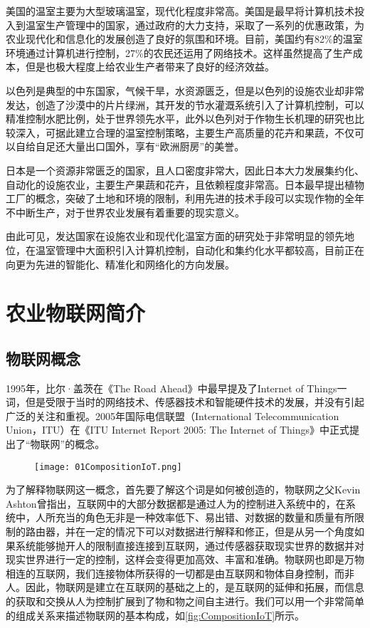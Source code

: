 美国的温室主要为大型玻璃温室，现代化程度非常高。美国是最早将计算机技术投入到温室生产管理中的国家，通过政府的大力支持，采取了一系列的优惠政策，为农业现代化和信息化的发展创造了良好的氛围和环境。目前，美国约有82\%的温室环境通过计算机进行控制，27\%的农民还运用了网络技术。这样虽然提高了生产成本，但是也极大程度上给农业生产者带来了良好的经济效益。

以色列是典型的中东国家，气候干旱，水资源匮乏，但是以色列的设施农业却非常发达，创造了沙漠中的片片绿洲，其开发的节水灌溉系统引入了计算机控制，可以精准控制水肥比例，处于世界领先水平，此外以色列对于作物生长机理的研究也比较深入，可据此建立合理的温室控制策略，主要生产高质量的花卉和果蔬，不仅可以自给自足还大量出口国外，享有“欧洲厨房”的美誉。

日本是一个资源非常匮乏的国家，且人口密度非常大，因此日本大力发展集约化、自动化的设施农业，主要生产果蔬和花卉，且依赖程度非常高。日本最早提出植物工厂的概念，突破了土地和环境的限制，利用先进的技术手段可以实现作物的全年不中断生产，对于世界农业发展有着重要的现实意义。

由此可见，发达国家在设施农业和现代化温室方面的研究处于非常明显的领先地位，在温室管理中大面积引入计算机控制，自动化和集约化水平都较高，目前正在向更为先进的智能化、精准化和网络化的方向发展。

\section{农业物联网简介}
	\subsection{物联网概念}
1995年，比尔·盖茨在《The Road Ahead》中最早提及了Internet of Things一词，但是受限于当时的网络技术、传感器技术和智能硬件技术的发展，并没有引起广泛的关注和重视。2005年国际电信联盟（International Telecommunication Union，ITU）在《ITU Internet Report 2005: The Internet of Things》中正式提出了“物联网”的概念。
	
	\begin{figure}[!htp]
  		\centering
 		\texttt{[image: 01CompositionIoT.png]}
	\end{figure}
	
为了解释物联网这一概念，首先要了解这个词是如何被创造的，物联网之父Kevin Ashton曾指出，互联网中的大部分数据都是通过人为的控制进入系统中的，在系统中，人所充当的角色无非是一种效率低下、易出错、对数据的数量和质量有所限制的路由器，并在一定的情况下可以对数据进行解释和修正，但是从另一个角度如果系统能够抛开人的限制直接连接到互联网，通过传感器获取现实世界的数据并对现实世界进行一定的控制，这样会变得更加高效、丰富和准确。物联网也即是万物相连的互联网，我们连接物体所获得的一切都是由互联网和物体自身控制，而非人。因此，物联网是建立在互联网的基础之上的，是互联网的延伸和拓展，而信息的获取和交换从人为控制扩展到了物和物之间自主进行。我们可以用一个非常简单的组成关系来描述物联网的基本构成，如\ref{fig:CompositionIoT}所示。
	
